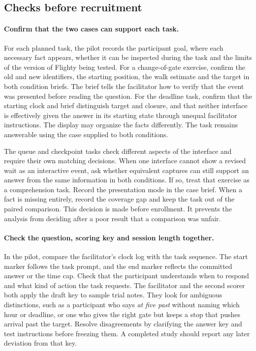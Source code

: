 \documentclass[sigconf,nonacm,balance=false]{acmart}
\begin{document}
\subsection{Checks before recruitment}
\paragraph{Confirm that the two cases can support each task.} For each planned task, the pilot records the participant goal, where each necessary fact appears, whether it can be inspected during the task and the limits of the version of Flighty being tested. For a change-of-gate exercise, confirm the old and new identifiers, the starting position, the walk estimate and the target in both condition briefs. The brief tells the facilitator how to verify that the event was presented before reading the question. For the deadline task, confirm that the starting clock and brief distinguish target and closure, and that neither interface is effectively given the answer in its starting state through unequal facilitator instructions. The display may organize the facts differently. The task remains answerable using the case supplied to both conditions.

The queue and checkpoint tasks check different aspects of the interface and require their own matching decisions. When one interface cannot show a revised wait as an interactive event, ask whether equivalent captures can still support an answer from the same information in both conditions. If so, treat that exercise as a comprehension task. Record the presentation mode in the case brief. When a fact is missing entirely, record the coverage gap and keep the task out of the paired comparison. This decision is made before enrollment. It prevents the analysis from deciding after a poor result that a comparison was unfair.

\paragraph{Check the question, scoring key and session length together.} In the pilot, compare the facilitator's clock log with the task sequence. The start marker follows the task prompt, and the end marker reflects the committed answer or the time cap. Check that the participant understands when to respond and what kind of action the task requests. The facilitator and the second scorer both apply the draft key to sample trial notes. They look for ambiguous distinctions, such as a participant who says \emph{at five past} without naming which hour or deadline, or one who gives the right gate but keeps a stop that pushes arrival past the target. Resolve disagreements by clarifying the answer key and test instructions before freezing them. A completed study should report any later deviation from that key.
\end{document}
